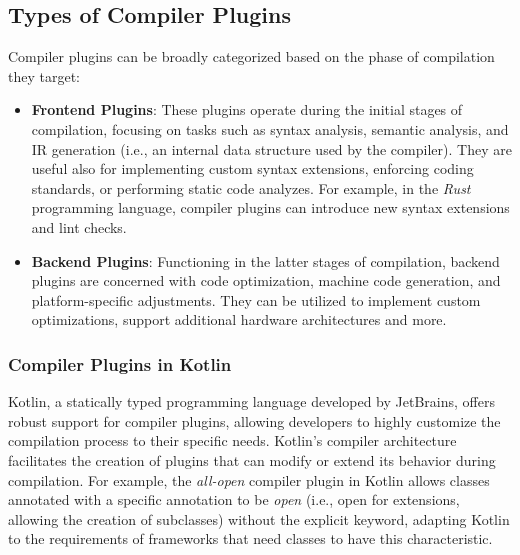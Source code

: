 \documentclass[12pt,a4paper,openright,twoside]{book}
\begin{document}
\subsection{Types of Compiler Plugins}

Compiler plugins can be broadly categorized based on the phase of compilation they target:

\begin{itemize}
  \item \textbf{Frontend Plugins}: These plugins operate during the initial
  stages of compilation, focusing on tasks such as syntax analysis, semantic
  analysis, and \ac{IR} generation (i.e., an internal data structure used by the
  compiler). They are useful also for implementing custom syntax extensions,
  enforcing coding standards, or performing static code analyzes. For example,
  in the \emph{Rust} programming language, compiler plugins can introduce new
  syntax extensions and lint checks. 

  \item \textbf{Backend Plugins}: Functioning in the latter stages of
  compilation, backend plugins are concerned with code optimization, machine
  code generation, and platform-specific adjustments. They can be utilized to
  implement custom optimizations, support additional hardware
  architectures and more.
\end{itemize}

\subsubsection{Compiler Plugins in Kotlin}

Kotlin, a statically typed programming language developed by JetBrains, offers
robust support for compiler plugins, allowing developers to highly customize the
compilation process to their specific needs. 
%
Kotlin's compiler architecture facilitates the creation of plugins that can
modify or extend its behavior during compilation. For example, the
\emph{all-open} compiler plugin in Kotlin allows classes annotated with a
specific annotation to be \emph{open} (i.e., open for extensions, allowing the
creation of subclasses) without the explicit  keyword, adapting
Kotlin to the requirements of frameworks that need classes to have this
characteristic. 
\end{document}
